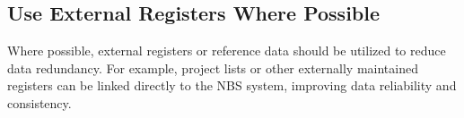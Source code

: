 \subsection{Use External Registers Where Possible}
Where possible, external registers or reference data should be utilized to reduce data redundancy. For example, project lists or other externally maintained registers can be linked directly to the NBS system, improving data reliability and consistency.

\newpage